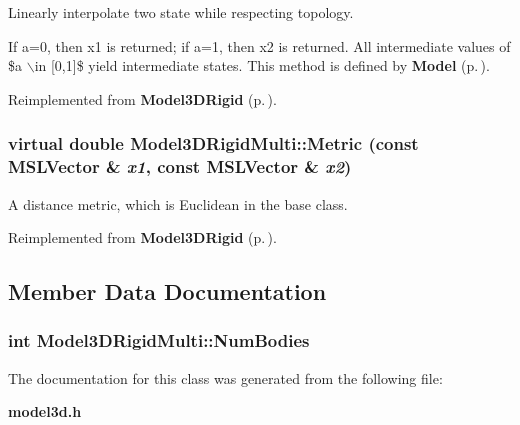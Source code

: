 Linearly interpolate two state while respecting topology.

If a=0, then x1 is returned; if a=1, then x2 is returned. All intermediate values of \$a $\backslash$in [0,1]\$ yield intermediate states. This method is defined by {\bf Model} {\rm (p.\,\pageref{class_Model})}. 

Reimplemented from {\bf Model3DRigid} {\rm (p.\,\pageref{class_Model3DRigid_a5})}.
\subsubsection{\setlength{\rightskip}{0pt plus 5cm}virtual double Model3DRigid\-Multi::Metric (const {\bf MSLVector} \& {\em x1}, const {\bf MSLVector} \& {\em x2})\hspace{0.3cm}{\tt  [virtual]}}\label{class_Model3DRigidMulti_a2}


A distance metric, which is Euclidean in the base class.



Reimplemented from {\bf Model3DRigid} {\rm (p.\,\pageref{class_Model3DRigid_a4})}.

\subsection{Member Data Documentation}
\subsubsection{\setlength{\rightskip}{0pt plus 5cm}int Model3DRigid\-Multi::Num\-Bodies}\label{class_Model3DRigidMulti_m0}




The documentation for this class was generated from the following file:\begin{CompactItemize}
\item 
{\bf model3d.h}\end{CompactItemize}

